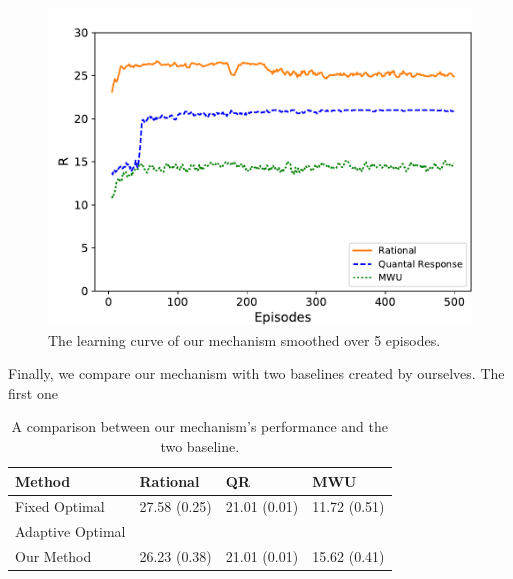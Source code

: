 \begin{figure}[t]
\centering
\includegraphics[scale=0.4]{image/learningCurve}
\vspace{-2mm}
\caption{The learning curve of our mechanism smoothed over 5 episodes.}
\label{figure:learningCurve}
\end{figure}

Finally, we compare our mechanism with two baselines created by ourselves. The first one

\begin{table}
\label{table:performance}
\caption{A comparison between our mechanism's performance and the two baseline.}
\vskip 0.15in
\centering
{\scriptsize
\begin{sc}
\begin{tabular}{ l | l | l | l }
Method & Rational & QR & MWU \\ \hline \hline
Fixed Optimal & 27.58 (0.25) & 21.01 (0.01) & 11.72 (0.51) \\
Adaptive Optimal & & & \\
Our Method & 26.23 (0.38) & 21.01 (0.01) & 15.62 (0.41)\\
\end{tabular}
\end{sc}
}
\vskip -0.1in
\end{table}




